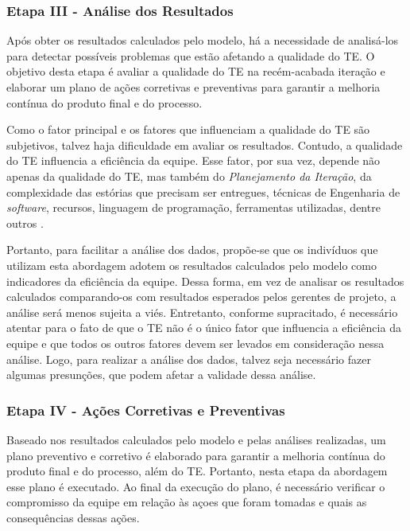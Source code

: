 \subsubsection{Etapa III - Análise dos Resultados}
\label{descricao:analise}

Após obter os resultados calculados pelo modelo, há a necessidade de analisá-los para detectar possíveis problemas que estão afetando a qualidade do TE. O objetivo desta etapa é avaliar a qualidade do TE na recém-acabada iteração e elaborar um plano de ações corretivas e preventivas para garantir a melhoria contínua do produto final e do processo.

Como o fator principal e os fatores que influenciam a qualidade do TE são subjetivos, talvez haja dificuldade em avaliar os resultados. Contudo, a qualidade do TE influencia a eficiência da equipe. Esse fator, por sua vez, depende não apenas da qualidade do TE, mas também do \textit{Planejamento da Iteração}, da complexidade das estórias que precisam ser entregues, técnicas de Engenharia de \textit{software}, recursos, linguagem de programação, ferramentas utilizadas, dentre outros \cite{melo}.

Portanto, para facilitar a análise dos dados, propõe-se que os indivíduos que utilizam esta abordagem adotem os resultados calculados pelo modelo como indicadores da eficiência da equipe. Dessa forma, em vez de analisar os resultados calculados comparando-os com resultados esperados pelos gerentes de projeto, a análise será menos sujeita a viés. Entretanto, conforme supracitado, é necessário atentar para o fato de que o TE não é o único fator que influencia a eficiência da equipe e que todos os outros fatores devem ser levados em consideração nessa análise. Logo, para realizar a análise dos dados, talvez seja necessário fazer algumas presunções, que podem afetar a validade dessa análise.


\subsubsection{Etapa IV - Ações Corretivas e Preventivas}
\label{descricao:acoes}

Baseado nos resultados calculados pelo modelo e pelas análises realizadas, um plano preventivo e corretivo é elaborado para garantir a melhoria contínua do produto final e do processo, além do TE. Portanto, nesta etapa da abordagem esse plano é executado. Ao final da execução do plano, é necessário verificar o compromisso da equipe em relação às açoes que foram tomadas e quais as consequências dessas ações.
